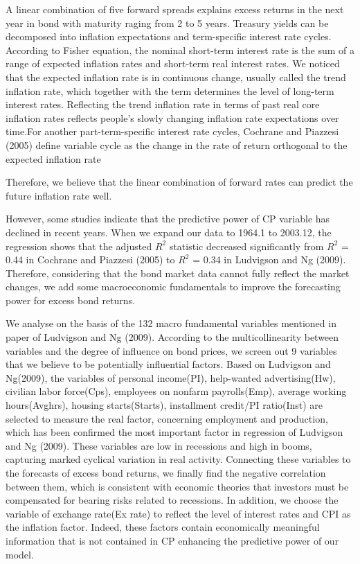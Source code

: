 \documentclass[12pt]{article}
\begin{document}
A linear combination of five forward spreads explains excess returns in the next year in bond with maturity raging from 2 to 5 years. Treasury yields can be decomposed into inflation expectations and term-specific interest rate cycles. According to Fisher equation, the nominal short-term interest rate is the sum of a range of expected inflation rates and short-term real interest rates. We noticed that the expected inflation rate is in continuous change, usually called the trend inflation rate, which together with the term determines the level of long-term interest rates. Reflecting the trend inflation rate in terms of past real core inflation rates reflects people's slowly changing inflation rate expectations over time.For another part-term-specific interest rate cycles, Cochrane and Piazzesi (2005)\cite{cochrane2005bond} define variable cycle as the change in the rate of return orthogonal to the expected inflation rate

Therefore, we believe that the linear combination of forward rates can predict the future inflation rate well.

However, some studies indicate that the predictive power of CP variable has declined in recent years. When we expand our data to 1964.1 to 2003.12, the regression shows that the adjusted $R^2$ statistic decreased significantly from $R^2$ = 0.44 in Cochrane and Piazzesi (2005)\cite{cochrane2005bond} to $R^2$ = 0.34 in Ludvigson and Ng (2009)\cite{ludvigson2009macro}. Therefore, considering that the bond market data cannot fully reflect the market changes, we add some macroeconomic fundamentals to improve the forecasting power for excess bond returns.

We analyse on the basis of the 132 macro fundamental variables mentioned in paper of Ludvigson and Ng (2009)\cite{ludvigson2009macro}. According to the multicollinearity between variables and the degree of influence on bond prices, we screen out 9 variables that we believe to be potentially influential factors. Based on Ludvigson and Ng(2009)\cite{ludvigson2009macro}, the variables of personal income(PI), help-wanted advertising(Hw), civilian labor force(Cps), employees on nonfarm payrolls(Emp), average working hours(Avghrs), housing starts(Starts), installment credit/PI ratio(Inst) are selected to measure the real factor, concerning employment and production, which has been confirmed the most important factor in regression of Ludvigson and Ng (2009)\cite{ludvigson2009macro}. These variables are low in recessions and high in booms, capturing marked cyclical variation in real activity. Connecting these variables to the forecasts of excess bond returns, we finally find the negative correlation between them, which is consistent with economic theories that investors must be compensated for bearing risks related to recessions. In addition, we choose the variable of exchange rate(Ex rate) to reflect the level of interest rates and CPI as the inflation factor. Indeed, these factors contain economically meaningful information that is not contained in CP enhancing the predictive power of our model.
\end{document}
